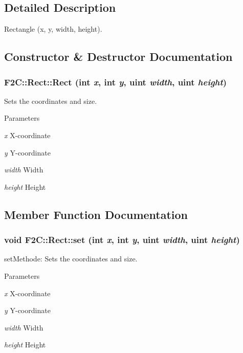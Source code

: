 \subsection{Detailed Description}
Rectangle (x, y, width, height). 

\subsection{Constructor \& Destructor Documentation}
\hypertarget{class_f2_c_1_1_rect_a8bcb9a48495ea4d148adcef272e67822}{
\subsubsection[{Rect}]{\setlength{\rightskip}{0pt plus 5cm}F2C::Rect::Rect (int {\em x}, \/  int {\em y}, \/  {\bf uint} {\em width}, \/  {\bf uint} {\em height})}}
\label{class_f2_c_1_1_rect_a8bcb9a48495ea4d148adcef272e67822}


Sets the coordinates and size. 
\begin{DoxyParams}{Parameters}
\item[{\em x}]X-\/coordinate \item[{\em y}]Y-\/coordinate \item[{\em width}]Width \item[{\em height}]Height \end{DoxyParams}


\subsection{Member Function Documentation}
\hypertarget{class_f2_c_1_1_rect_ad7bf1745dbafc37295e53cd0f72e12f2}{
\subsubsection[{set}]{\setlength{\rightskip}{0pt plus 5cm}void F2C::Rect::set (int {\em x}, \/  int {\em y}, \/  {\bf uint} {\em width}, \/  {\bf uint} {\em height})}}
\label{class_f2_c_1_1_rect_ad7bf1745dbafc37295e53cd0f72e12f2}


setMethode: Sets the coordinates and size. 
\begin{DoxyParams}{Parameters}
\item[{\em x}]X-\/coordinate \item[{\em y}]Y-\/coordinate \item[{\em width}]Width \item[{\em height}]Height \end{DoxyParams}
